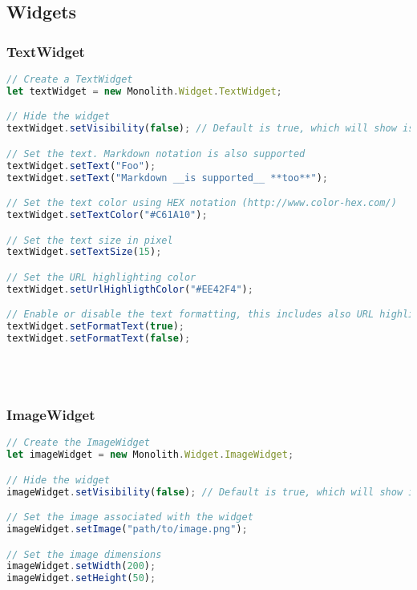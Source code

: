 \subsection{Widgets}
\subsubsection{TextWidget}
\begin{lstlisting}[language=JavaScript]
// Create a TextWidget
let textWidget = new Monolith.Widget.TextWidget;

// Hide the widget
textWidget.setVisibility(false); // Default is true, which will show is

// Set the text. Markdown notation is also supported
textWidget.setText("Foo");
textWidget.setText("Markdown __is supported__ **too**");

// Set the text color using HEX notation (http://www.color-hex.com/)
textWidget.setTextColor("#C61A10");

// Set the text size in pixel
textWidget.setTextSize(15);

// Set the URL highlighting color
textWidget.setUrlHighligthColor("#EE42F4");

// Enable or disable the text formatting, this includes also URL highlighting
textWidget.setFormatText(true);
textWidget.setFormatText(false);
\end{lstlisting}
~\\~\\

\subsubsection{ImageWidget}
\begin{lstlisting}[language=JavaScript]
// Create the ImageWidget
let imageWidget = new Monolith.Widget.ImageWidget;

// Hide the widget
imageWidget.setVisibility(false); // Default is true, which will show is

// Set the image associated with the widget
imageWidget.setImage("path/to/image.png");

// Set the image dimensions
imageWidget.setWidth(200);
imageWidget.setHeight(50);
\end{lstlisting}

\newpage

